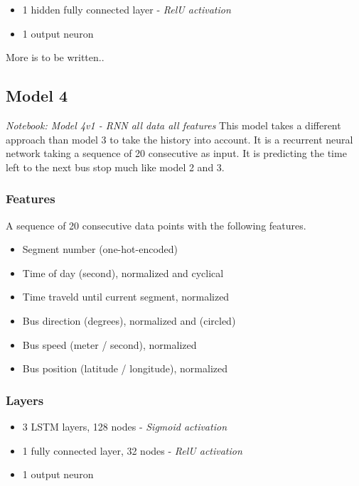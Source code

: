 \begin{itemize}
    \item 1 hidden fully connected layer - \textit{RelU activation}
    \item 1 output neuron
\end{itemize}

More is to be written..

\subsection{Model 4}
\textit{Notebook: Model 4v1 - RNN all data all features}
\newline
\noindent This model takes a different approach than model 3 to take the history into account. It is a recurrent neural network taking a sequence of 20 consecutive as input. It is predicting the time left to the next bus stop much like model 2 and 3.

\subsubsection{Features}
A sequence of 20 consecutive data points with the following features. 
\begin{itemize}
    \item Segment number (one-hot-encoded)
    \item Time of day (second), normalized and cyclical
    \item Time traveld until current segment, normalized
    \item Bus direction (degrees), normalized and (circled)
    \item Bus speed (meter / second), normalized
    \item Bus position (latitude / longitude), normalized
\end{itemize}

\subsubsection{Layers}

\begin{itemize}
    \item 3 LSTM layers, 128 nodes - \textit{Sigmoid activation}
    \item 1 fully connected layer, 32 nodes - \textit{RelU activation}
    \item 1 output neuron
\end{itemize}

